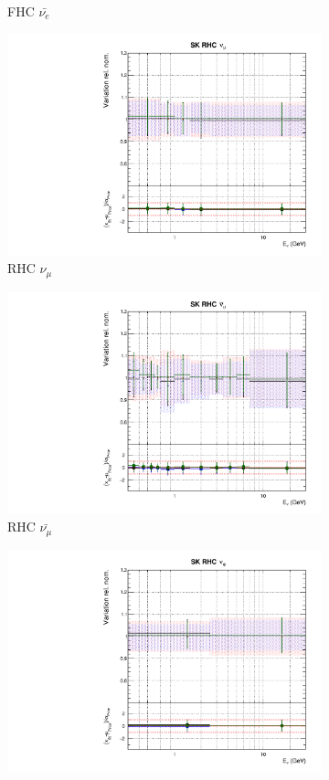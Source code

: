 \begin{figure}
\begin{subfigure}{0.45\textwidth}
  \caption{\SK FHC $\bar{\nu_e}$}
\end{subfigure}
\begin{subfigure}{0.45\textwidth}
  \centering
  \includegraphics[width=0.75\linewidth]{figs/hptpcfitsflux_12}
  \caption{\SK RHC $\nu_{\mu}$}
\end{subfigure}
\begin{subfigure}{0.45\textwidth}
  \centering
  \includegraphics[width=0.75\linewidth]{figs/hptpcfitsflux_13}
  \caption{\SK RHC $\bar{\nu_{\mu}}$}
\end{subfigure}
\begin{subfigure}{0.45\textwidth}
  \centering
  \includegraphics[width=0.75\linewidth]{figs/hptpcfitsflux_14}

\end{subfigure}
\end{figure}
